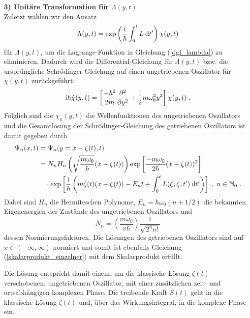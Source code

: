       \textbf{3) Unitäre Transformation für $\Lambda(y,t)$}\\
      Zuletzt wählen wir den Ansatz
      \begin{equation}
        \Lambda(y,t) = \exp\left(\frac{\text i}{\hbar}\int_0^tL \: \text d t'\right)\chi(y,t)
      \end{equation}
      für $\Lambda(y,t)$, um die Lagrange-Funktion in Gleichung (\ref{dgl_lambda}) zu eliminieren.
      Dadurch wird die Differential-Gleichung für $\Lambda(y,t)$ bzw. die ursprüngliche Schrödinger-Gleichung auf einen ungetriebenen Oszillator für $\chi(y,t)$ zurückgeführt:
      \begin{equation}
        \text i \hbar \dot \chi(y,t) = \left[ \frac{-\hbar^2}{2m}\frac{\partial^2}{\partial y^2} + \frac{1}{2}m\omega_0^2y^2 \right]\chi(y,t) \; .
      \end{equation}
      Folglich sind die $\chi_n(y,t)$ die Wellenfunktionen des ungetriebenen Oszillators und die Gesamtlösung der Schrödinger-Gleichung des getriebenen Oszillators ist damit gegeben durch
      \begin{align}
        \begin{split}
        \Psi_n(x,t) &= \Psi_n(y=x-\zeta(t),t) \\
        &= N_nH_n\left(\sqrt{\frac{m\omega_0}{\hbar}}(x-\zeta(t))\right) \exp\left[\frac{-m\omega_0}{2\hbar}(x-\zeta(t))^2\right] \\
        &\quad \cdot \exp\left[\frac{\text i}{\hbar}\left(m\dot \zeta(t)(x-\zeta(t))-E_nt+\int_0^tL(\dot \zeta,\zeta,t')\:\text dt'\right)\right] \; ,
        \; n \in \mathbb{N}_0 \; .
        \label{gesamtlsg_einzelner}
      \end{split}
      \end{align}
      Dabei sind $H_n$ die Hermiteschen Polynome, $E_n = \hbar \omega_0(n+1/2)$ die bekannten Eigenenergien der Zustände des ungetriebenen Oszillators und
      \begin{equation}
        N_n = \left(\frac{m\omega_0}{\pi \hbar}\right) \frac{1}{\sqrt{2^nn!}}
      \end{equation}
      dessen Normierungsfaktoren.
      Die Lösungen des getriebenen Oszillators sind auf $x \in (-\infty, \infty)$ normiert und somit ist ebenfalls Gleichung (\ref{skalarprodukt_einzelner}) mit dem Skalarprodukt erfüllt.

      Die Lösung entspricht damit einem, um die klassische Lösung $\zeta(t)$ verschobenen, ungetriebenen Oszillator, mit einer zusätzlichen zeit- und ortsabhängigen komplexen Phase.
      Die treibende Kraft $S(t)$ geht in die klassische Lösung $\zeta(t)$ und, über das Wirkungsintegral, in die komplexe Phase ein.



